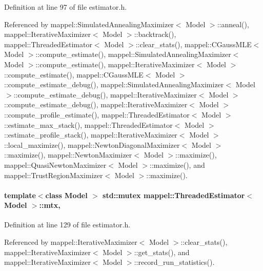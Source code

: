 Definition at line 97 of file estimator.\+h.



Referenced by mappel\+::\+Simulated\+Annealing\+Maximizer$<$ Model $>$\+::anneal(), mappel\+::\+Iterative\+Maximizer$<$ Model $>$\+::backtrack(), mappel\+::\+Threaded\+Estimator$<$ Model $>$\+::clear\+\_\+stats(), mappel\+::\+C\+Gauss\+M\+L\+E$<$ Model $>$\+::compute\+\_\+estimate(), mappel\+::\+Simulated\+Annealing\+Maximizer$<$ Model $>$\+::compute\+\_\+estimate(), mappel\+::\+Iterative\+Maximizer$<$ Model $>$\+::compute\+\_\+estimate(), mappel\+::\+C\+Gauss\+M\+L\+E$<$ Model $>$\+::compute\+\_\+estimate\+\_\+debug(), mappel\+::\+Simulated\+Annealing\+Maximizer$<$ Model $>$\+::compute\+\_\+estimate\+\_\+debug(), mappel\+::\+Iterative\+Maximizer$<$ Model $>$\+::compute\+\_\+estimate\+\_\+debug(), mappel\+::\+Iterative\+Maximizer$<$ Model $>$\+::compute\+\_\+profile\+\_\+estimate(), mappel\+::\+Threaded\+Estimator$<$ Model $>$\+::estimate\+\_\+max\+\_\+stack(), mappel\+::\+Threaded\+Estimator$<$ Model $>$\+::estimate\+\_\+profile\+\_\+stack(), mappel\+::\+Iterative\+Maximizer$<$ Model $>$\+::local\+\_\+maximize(), mappel\+::\+Newton\+Diagonal\+Maximizer$<$ Model $>$\+::maximize(), mappel\+::\+Newton\+Maximizer$<$ Model $>$\+::maximize(), mappel\+::\+Quasi\+Newton\+Maximizer$<$ Model $>$\+::maximize(), and mappel\+::\+Trust\+Region\+Maximizer$<$ Model $>$\+::maximize().

\paragraph[{\texorpdfstring{mtx}{mtx}}]{\setlength{\rightskip}{0pt plus 5cm}template$<$class Model $>$ std\+::mutex {\bf mappel\+::\+Threaded\+Estimator}$<$ Model $>$\+::mtx\hspace{0.3cm}{\ttfamily [protected]}, {\ttfamily [inherited]}}\hypertarget{classmappel_1_1ThreadedEstimator_a4538fd0860243430bfd47e8064c8cfe4}{}\label{classmappel_1_1ThreadedEstimator_a4538fd0860243430bfd47e8064c8cfe4}


Definition at line 129 of file estimator.\+h.



Referenced by mappel\+::\+Iterative\+Maximizer$<$ Model $>$\+::clear\+\_\+stats(), mappel\+::\+Iterative\+Maximizer$<$ Model $>$\+::get\+\_\+stats(), and mappel\+::\+Iterative\+Maximizer$<$ Model $>$\+::record\+\_\+run\+\_\+statistics().

